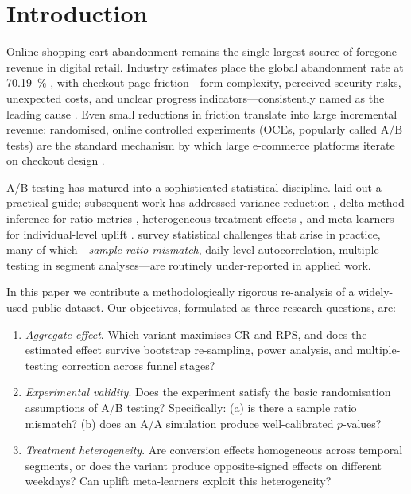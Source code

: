 \documentclass[pdflatex,sn-mathphys-num]{sn-jnl}
\theoremstyle{thmstyleone}
\theoremstyle{thmstyletwo}
\theoremstyle{thmstylethree}
\begin{document}
\maketitle

\section{Introduction}\label{sec:intro}

Online shopping cart abandonment remains the single largest source of foregone revenue in digital retail.
Industry estimates place the global abandonment rate at \SI{70.19}{\percent} \cite{kukar2010determinants},
with checkout-page friction—form complexity, perceived security risks,
unexpected costs, and unclear progress indicators—consistently named as the leading cause
\cite{kukar2010determinants,huang2018mobile,mcdowell2016retail}.
Even small reductions in friction translate into large incremental revenue:
randomised, online controlled experiments (OCEs, popularly called A/B tests)
are the standard mechanism by which large e-commerce platforms iterate on checkout design
\cite{kohavi2009controlled,kohavi2020trustworthy}.

A/B testing has matured into a sophisticated statistical discipline.
\cite{kohavi2009controlled} laid out a practical guide; subsequent work has
addressed variance reduction \cite{deng2013improving},
delta-method inference for ratio metrics \cite{deng2018applying},
heterogeneous treatment effects \cite{taddy2016nonparametric,yu2018false},
and meta-learners for individual-level uplift \cite{devriendt2018literature,gubela2020response,athey2019machine}.
\cite{larsen2024statistical} survey statistical challenges that arise in practice,
many of which—\emph{sample ratio mismatch}, daily-level autocorrelation,
multiple-testing in segment analyses—are routinely under-reported in applied work.

In this paper we contribute a methodologically rigorous re-analysis of a widely-used
public dataset.
Our objectives, formulated as three research questions, are:

\begin{enumerate}
\item[\textbf{RQ1}] \emph{Aggregate effect}. Which variant maximises CR and RPS, and does the
estimated effect survive bootstrap re-sampling, power analysis, and multiple-testing correction across funnel stages?
\item[\textbf{RQ2}] \emph{Experimental validity}. Does the experiment satisfy the basic
randomisation assumptions of A/B testing? Specifically: (a) is there a sample ratio mismatch?
(b) does an A/A simulation produce well-calibrated $p$-values?
\item[\textbf{RQ3}] \emph{Treatment heterogeneity}. Are conversion effects homogeneous across
temporal segments, or does the variant produce opposite-signed effects on different weekdays?
Can uplift meta-learners exploit this heterogeneity?
\end{enumerate}
\end{document}

